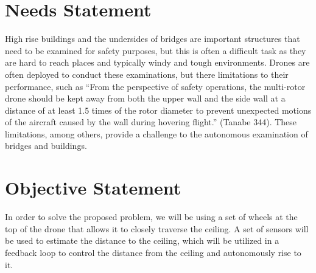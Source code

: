 \documentclass[12pt]{article}
\begin{document}
    \section{Needs Statement}
        High rise buildings and the undersides of bridges are important structures that need to be examined for safety purposes, but this is often a difficult task as they are hard to reach places and typically windy and tough environments. Drones are often deployed to conduct these examinations, but there limitations to their performance, such as “From the perspective of safety operations, the multi-rotor drone should be kept away from both the upper wall and the side wall at a distance of at least 1.5 times of the rotor diameter to prevent unexpected motions of the aircraft caused by the wall during hovering flight.” (Tanabe 344). These limitations, among others, provide a challenge to the autonomous examination of bridges and buildings.

    \section{Objective Statement}
        In order to solve the proposed problem, we will be using a set of wheels at the top of the drone that allows it to closely traverse the ceiling. A set of sensors will be used to estimate the distance to the ceiling, which will be utilized in a feedback loop to control the distance from the ceiling and autonomously rise to it.

    \newpage
\end{document}
